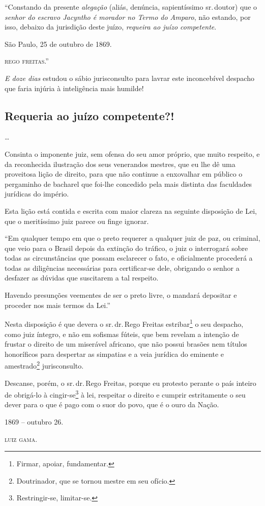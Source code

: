 ``Constando da presente \emph{alegação} (aliás, denúncia, sapientíssimo
sr.\,doutor) que o \emph{senhor do escravo Jacyntho é morador no Termo do
Amparo}, não estando, por isso, debaixo da jurisdição deste juízo,
\emph{requeira ao juízo competente}.
\begin{flushright}
São Paulo, 25 de outubro de 1869.

\textsc{rego freitas}.''
\end{flushright}
\emph{E doze dias} estudou o sábio jurisconsulto para lavrar este
inconcebível despacho que faria injúria à inteligência mais humilde!

\subsection{Requeria ao juízo competente?!}\ldots{}

Consinta o imponente juiz, sem ofensa do seu amor próprio, que muito
respeito, e da reconhecida ilustração dos seus venerandos mestres, que
eu lhe dê uma proveitosa lição de direito, para que não continue a
enxovalhar em público o pergaminho de bacharel que foi-lhe concedido
pela mais distinta das faculdades jurídicas do império.

Esta lição está contida e escrita com maior clareza na seguinte
disposição de Lei, que o meritíssimo juiz parece ou finge ignorar.

``Em qualquer tempo em que o preto requerer a qualquer juiz de paz, ou
criminal, que veio para o Brasil depois da extinção do tráfico, o juiz o
interrogará sobre todas as circunstâncias que possam esclarecer o fato,
e oficialmente procederá a todas as diligências necessárias para
certificar-se dele, obrigando o senhor a desfazer as dúvidas que
suscitarem a tal respeito.

Havendo presunções veementes de ser o preto livre, o mandará depositar e
proceder nos mais termos da Lei.''

Nesta disposição é que devera o sr.\,dr.\,Rego Freitas estribar\footnote{
  Firmar, apoiar, fundamentar.} o seu despacho, como juiz íntegro, e não
em sofismas fúteis, que bem revelam a intenção de frustar o direito de
um miserável africano, que não possui brasões nem títulos honoríficos
para despertar as simpatias e a veia jurídica do eminente e
amestrado\footnote{Doutrinador, que se tornou mestre em seu ofício.}
jurisconsulto.

Descanse, porém, o sr.\,dr.\,Rego Freitas, porque eu protesto perante o
país inteiro de obrigá-lo à cingir-se\footnote{Restringir-se,
  limitar-se.} à lei, respeitar o direito e cumprir estritamente o seu
dever para o que é pago com o suor do povo, que é o ouro da Nação.
\begin{flushright}
1869 -- outubro 26.

\textsc{luiz gama}.
\end{flushright}

